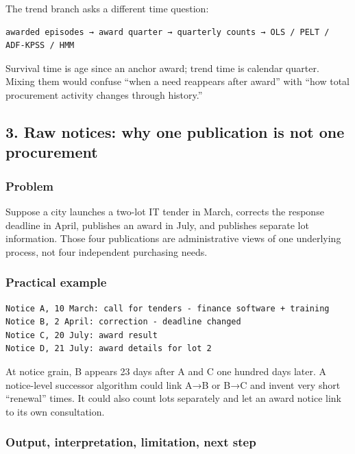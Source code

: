 The trend branch asks a different time question:

\begin{verbatim}
awarded episodes → award quarter → quarterly counts → OLS / PELT / ADF-KPSS / HMM
\end{verbatim}

Survival time is age since an anchor award; trend time is calendar
quarter. Mixing them would confuse ``when a need reappears after award''
with ``how total procurement activity changes through history.''

\subsection{3. Raw notices: why one publication is not one
procurement}\label{3-raw-notices-why-one-publication-is-not-one-procurement}

\subsubsection{Problem}\label{problem}

Suppose a city launches a two-lot IT tender in March, corrects the
response deadline in April, publishes an award in July, and publishes
separate lot information. Those four publications are administrative
views of one underlying process, not four independent purchasing needs.

\subsubsection{Practical example}\label{practical-example}

\begin{verbatim}
Notice A, 10 March: call for tenders - finance software + training
Notice B, 2 April: correction - deadline changed
Notice C, 20 July: award result
Notice D, 21 July: award details for lot 2
\end{verbatim}

At notice grain, B appears 23 days after A and C one hundred days later.
A notice-level successor algorithm could link A→B or B→C and invent very
short ``renewal'' times. It could also count lots separately and let an
award notice link to its own consultation.

\subsubsection{Output, interpretation, limitation, next
step}\label{output-interpretation-limitation-next-step}

